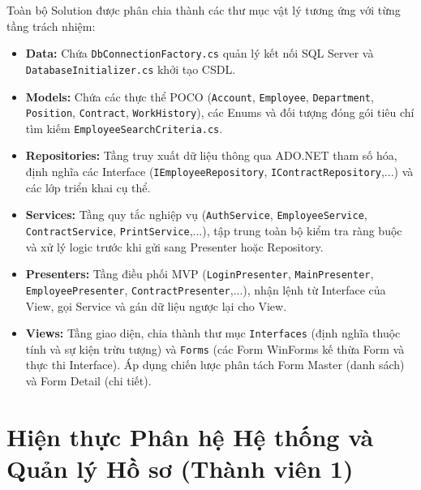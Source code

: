 \documentclass[12pt,a4paper]{report}
\begin{document}
Toàn bộ Solution được phân chia thành các thư mục vật lý tương ứng với từng tầng trách nhiệm:
\begin{itemize}[leftmargin=1.0cm]
    \item \textbf{Data:} Chứa \texttt{DbConnectionFactory.cs} quản lý kết nối SQL Server và \texttt{DatabaseInitializer.cs} khởi tạo CSDL.
    \item \textbf{Models:} Chứa các thực thể POCO (\texttt{Account}, \texttt{Employee}, \texttt{Department}, \texttt{Position}, \texttt{Contract}, \texttt{WorkHistory}), các Enums và đối tượng đóng gói tiêu chí tìm kiếm \texttt{EmployeeSearchCriteria.cs}.
    \item \textbf{Repositories:} Tầng truy xuất dữ liệu thông qua ADO.NET tham số hóa, định nghĩa các Interface (\texttt{IEmployeeRepository}, \texttt{IContractRepository},...) và các lớp triển khai cụ thể.
    \item \textbf{Services:} Tầng quy tắc nghiệp vụ (\texttt{AuthService}, \texttt{EmployeeService}, \texttt{ContractService}, \texttt{PrintService},...), tập trung toàn bộ kiểm tra ràng buộc và xử lý logic trước khi gửi sang Presenter hoặc Repository.
    \item \textbf{Presenters:} Tầng điều phối MVP (\texttt{LoginPresenter}, \texttt{MainPresenter}, \texttt{EmployeePresenter}, \texttt{ContractPresenter},...), nhận lệnh từ Interface của View, gọi Service và gán dữ liệu ngược lại cho View.
    \item \textbf{Views:} Tầng giao diện, chia thành thư mục \texttt{Interfaces} (định nghĩa thuộc tính và sự kiện trừu tượng) và \texttt{Forms} (các Form WinForms kế thừa Form và thực thi Interface). Áp dụng chiến lược phân tách Form Master (danh sách) và Form Detail (chi tiết).
\end{itemize}

\section{Hiện thực Phân hệ Hệ thống và Quản lý Hồ sơ (Thành viên 1)}
\end{document}
